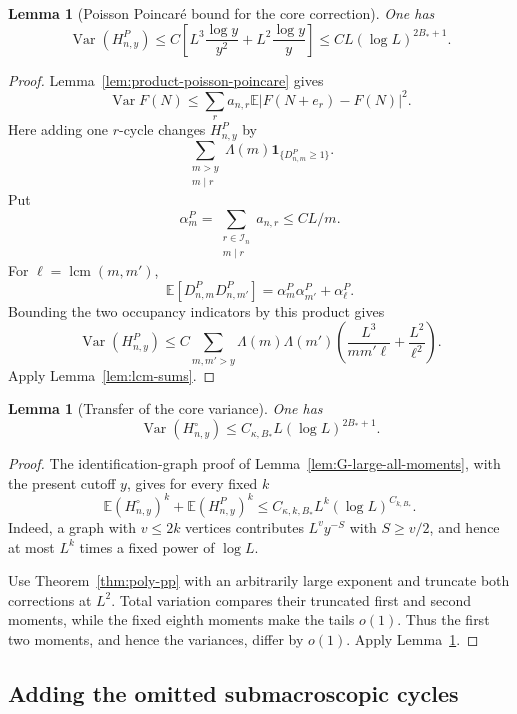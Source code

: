 \documentclass[11pt]{article}
\newtheorem{lemma}[theorem]{Lemma}
\theoremstyle{remark}
\newcommand{\Ee}{\mathbb E}
\newcommand{\Var}{\operatorname{Var}}
\newcommand{\one}{\mathbf 1}
\newcommand{\lcm}{\operatorname{lcm}}
\begin{document}
\begin{lemma}[Poisson Poincar\'e bound for the core correction]
\label{lem:poisson-poincare-H}
One has
\begin{equation}
\label{eq:poisson-H-variance}
 \Var(H_{n,y}^P)
 \le C\left[
 L^3\frac{\log y}{y^2}+L^2\frac{\log y}{y}
 \right]
 \le C L(\log L)^{2B_*+1}.
\end{equation}
\end{lemma}

\begin{proof}
Lemma~\ref{lem:product-poisson-poincare} gives
\[
 \Var F(N)\le\sum_r a_{n,r}\Ee|F(N+e_r)-F(N)|^2.
\]
Here adding one $r$-cycle changes $H_{n,y}^P$ by
\[
 \sum_{\substack{m>y\\m\mid r}}\Lambda(m)
 \one_{\{D_{n,m}^P\ge1\}}.
\]
Put
\[
 \alpha_m^P=\sum_{\substack{r\in\mathcal I_n\\m\mid r}}a_{n,r}
 \le CL/m.
\]
For $\ell=\lcm(m,m')$,
\[
 \Ee[D_{n,m}^PD_{n,m'}^P]
 =\alpha_m^P\alpha_{m'}^P+\alpha_\ell^P.
\]
Bounding the two occupancy indicators by this product gives
\[
 \Var(H_{n,y}^P)
 \le C\sum_{m,m'>y}\Lambda(m)\Lambda(m')
 \left(\frac{L^3}{mm'\ell}+\frac{L^2}{\ell^2}\right).
\]
Apply Lemma~\ref{lem:lcm-sums}.
\end{proof}

\begin{lemma}[Transfer of the core variance]
\label{lem:core-H-transfer}
One has
\[
 \Var(H_{n,y}^\circ)\le C_{\kappa,B_*}L(\log L)^{2B_*+1}.
\]
\end{lemma}

\begin{proof}
The identification-graph proof of
Lemma~\ref{lem:G-large-all-moments}, with the present cutoff $y$, gives for
every fixed $k$
\[
 \Ee(H_{n,y}^\circ)^k+\Ee(H_{n,y}^P)^k
 \le C_{\kappa,k,B_*}L^k(\log L)^{C_{k,B_*}}.
\]
Indeed, a graph with $v\le2k$ vertices contributes $L^vy^{-S}$ with
$S\ge v/2$, and hence at most $L^k$ times a fixed power of $\log L$.

Use Theorem~\ref{thm:poly-pp} with an arbitrarily large exponent and truncate
both corrections at $L^2$.  Total variation compares their truncated first
and second moments, while the fixed eighth moments make the tails $o(1)$.
Thus the first two moments, and hence the variances, differ by $o(1)$.
Apply Lemma~\ref{lem:poisson-poincare-H}.
\end{proof}

\subsection{Adding the omitted submacroscopic cycles}
\end{document}
